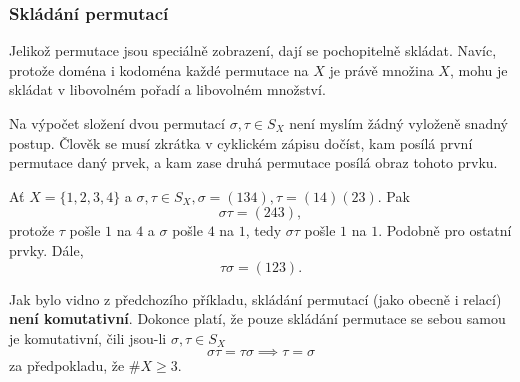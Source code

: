 \subsubsection{Skládání permutací}
\label{sssec:skladani-permutaci}

Jelikož permutace jsou speciálně zobrazení, dají se pochopitelně skládat. Navíc,
protože doména i kodoména každé permutace na $X$ je právě množina $X$, mohu je
skládat v libovolném pořadí a libovolném množství.

Na výpočet složení dvou permutací $\sigma,\tau \in S_X$ není myslím žádný
vyloženě snadný postup. Člověk se musí zkrátka v cyklickém zápisu dočíst, kam
posílá první permutace daný prvek, a kam zase druhá permutace posílá obraz
tohoto prvku.

\begin{example}
 Ať $X = \{1,2,3,4\}$ a $\sigma,\tau \in S_X, \sigma = (134), \tau = (14)(23)$.
 Pak
 \[
  \sigma\tau = (243),
 \]
 protože $\tau$ pošle $1$ na $4$ a $\sigma$ pošle $4$ na $1$, tedy  $\sigma\tau$
 pošle $1$ na $1$. Podobně pro ostatní prvky. Dále,
 \[
  \tau\sigma = (123).
 \]
\end{example}
\begin{warning}
 Jak bylo vidno z předchozího příkladu, skládání permutací (jako obecně i
 relací) \textbf{není komutativní}. Dokonce platí, že pouze skládání permutace
 se sebou samou je komutativní, čili jsou-li $\sigma,\tau \in S_X$
 \[
  \sigma\tau = \tau\sigma \implies \tau = \sigma
 \]
 za předpokladu, že $\# X \geq 3$.
\end{warning}

